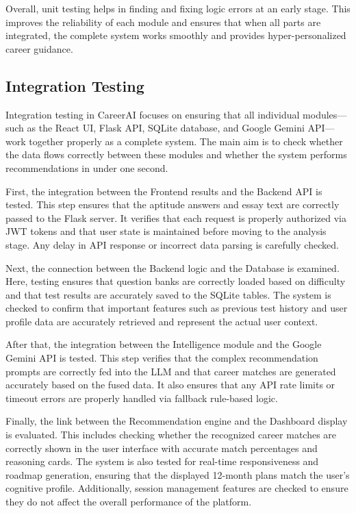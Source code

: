 Overall, unit testing helps in finding and fixing logic errors at an early stage. This improves the reliability of each module and ensures that when all parts are integrated, the complete system works smoothly and provides hyper-personalized career guidance. 
\subsection{Integration Testing}
{}Integration testing in CareerAI focuses on ensuring that all individual modules—such as the React UI, Flask API, SQLite database, and Google Gemini API—work together properly as a complete system. The main aim is to check whether the data flows correctly between these modules and whether the system performs recommendations in under one second.

First, the integration between the Frontend results and the Backend API is tested. This step ensures that the aptitude answers and essay text are correctly passed to the Flask server. It verifies that each request is properly authorized via JWT tokens and that user state is maintained before moving to the analysis stage. Any delay in API response or incorrect data parsing is carefully checked.

Next, the connection between the Backend logic and the Database is examined. Here, testing ensures that question banks are correctly loaded based on difficulty and that test results are accurately saved to the SQLite tables. The system is checked to confirm that important features such as previous test history and user profile data are accurately retrieved and represent the actual user context.

After that, the integration between the Intelligence module and the Google Gemini API is tested. This step verifies that the complex recommendation prompts are correctly fed into the LLM and that career matches are generated accurately based on the fused data. It also ensures that any API rate limits or timeout errors are properly handled via fallback rule-based logic.

Finally, the link between the Recommendation engine and the Dashboard display is evaluated. This includes checking whether the recognized career matches are correctly shown in the user interface with accurate match percentages and reasoning cards. The system is also tested for real-time responsiveness and roadmap generation, ensuring that the displayed 12-month plans match the user’s cognitive profile. Additionally, session management features are checked to ensure they do not affect the overall performance of the platform.
